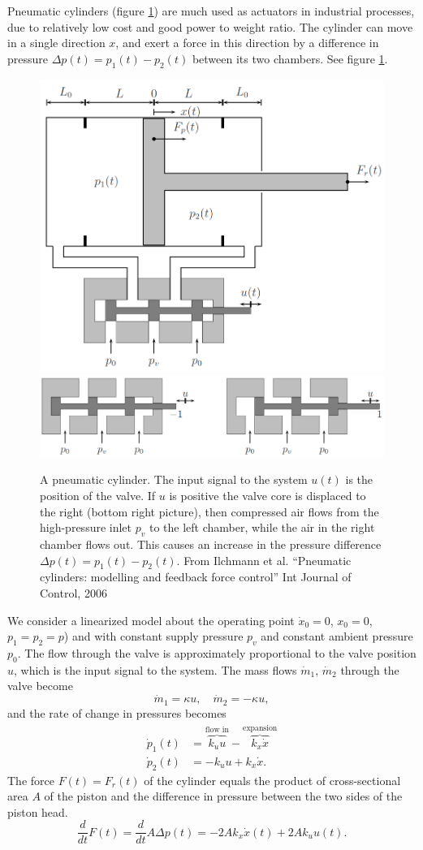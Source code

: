 \documentclass[letterpaper,12pt]{scrartcl}
\begin{document}
Pneumatic cylinders (figure \ref{fig:cylinder}) are much used as actuators in industrial processes, due to relatively low cost and good power to weight ratio. The cylinder can move in a single direction $x$, and exert a force in this direction by a difference in pressure $\Delta p(t) = p_1(t)-p_2(t)$ between its two chambers. See figure \ref{fig:cylinder}.
\begin{figure}[h]
\begin{center}
\includegraphics[width=0.6\linewidth]{../figures/pneumatic-cylinder.png}\\
\includegraphics[width=0.7\linewidth]{../figures/pneumatic-valve.png}
\caption{A pneumatic cylinder. The input signal to the system $u(t)$ is the position of the valve. If $u$ is positive the valve core is displaced to the right (bottom right picture), then compressed air flows from the high-pressure inlet $p_v$ to the left chamber, while the air in the right chamber flows out. This causes an increase in the pressure difference $\Delta p(t) = p_1(t)-p_2(t)$. {\footnotesize From Ilchmann et al. ``Pneumatic cylinders: modelling and feedback force control'' Int Journal of Control, 2006}}
\label{fig:cylinder}
\end{center}
\end{figure}
We consider a linearized model about the operating point $\dot{x}_0=0$, $x_0=0$, $p_1=p_2=p$) and with  constant supply pressure $p_v$ and constant ambient pressure $p_0$. The flow through the valve is approximately proportional to the valve position $u$, which is the input signal to the system. The mass flows $\dot{m}_1$, $\dot{m}_2$ through the valve become
\[ \dot{m}_1 = \kappa u, \quad \dot{m}_2 = -\kappa u, \]
and the rate of change in pressures becomes
\begin{align}
  \dot{p}_1(t) &= \overbrace{k_uu}^{\text{flow in}} - \overbrace{k_{x}\dot{x}}^{\text{expansion}}\\
  \dot{p}_2(t) &= -k_{u}u + k_{x}\dot{x}.
\end{align}
The force $F(t)=F_r(t)$ of the cylinder equals the product of cross-sectional area $A$ of the piston and the difference in pressure between the two sides of the piston head.
\begin{equation}
  \frac{d}{dt} F(t) = \frac{d}{dt} A \Delta p(t) = -2Ak_{x}\dot{x}(t) + 2Ak_{u}u(t).
\end{equation}
\end{document}

